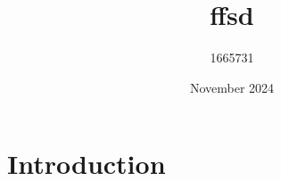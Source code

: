 \documentclass{article}
\title{ffsd}
\author{1665731 }
\date{November 2024}
\begin{document}
\maketitle

\section{Introduction}
\end{document}
